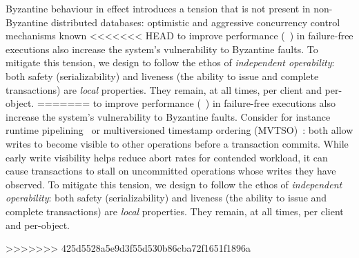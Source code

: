 Byzantine behaviour in effect introduces a tension that is not present in non-Byzantine
distributed databases: optimistic and aggressive concurrency control mechanisms known
<<<<<<< HEAD
to improve performance (~\cite{kung1981occ,bernstein1983mcc,reed1983atomic,xie2015callas,zhang2015tapir}) in failure-free executions also increase the system's vulnerability to Byzantine faults.   To mitigate this tension, we design \sys{} to follow the ethos of \textit{independent operability}: both safety (serializability) and liveness (the ability to issue and complete transactions) are \textit{local} properties. They remain, at all times, per client and per-object.  
=======
to improve performance (~\cite{kung1981occ,bernstein1983mcc,reed1983atomic,xie2015callas,zhang2015tapir}) in failure-free executions also increase the system's vulnerability to Byzantine faults.  Consider for instance runtime pipelining~\cite{xie2015callas,su2017tebaldi} or multiversioned timestamp ordering (MVTSO)~\cite{bernstein1983mcc,reed1983atomic}: both allow writes to become visible to other operations before a transaction commits. While early write visibility helps reduce abort rates for
contended workload, it can cause transactions to stall on uncommitted operations whose writes they have observed. To mitigate this tension, we design \sys{} to follow the ethos of \textit{independent operability}: both safety (serializability) and liveness (the ability to issue and complete transactions) are \textit{local} properties. They remain, at all times, per client and per-object.  

>>>>>>> 425d5528a5e9d3f55d530b86cba72f1651f1896a




